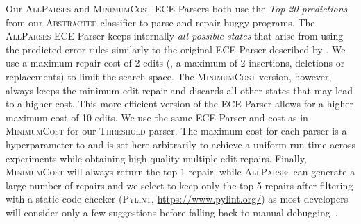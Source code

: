 Our \textsc{AllParses} and \textsc{MinimumCost} ECE-Parsers both use the
\emph{Top-20 predictions} from our \textsc{Abstracted} classifier to parse and
repair buggy programs. The \textsc{AllParses} ECE-Parser keeps internally
\emph{all possible states} that arise from using the predicted error rules
similarly to the original ECE-Parser described by \citet{Aho_1972}. We use a
maximum repair cost of 2 edits (\ie, a maximum of 2 insertions, deletions or
replacements) to limit the search space. The \textsc{MinimumCost} version,
however, always keeps the minimum-edit repair and discards all other states that
may lead to a higher cost. This more efficient version of the ECE-Parser allows
for a higher maximum cost of 10 edits. We use the same ECE-Parser and cost as in
\textsc{MinimumCost} for our \textsc{Threshold} parser. The maximum cost for
each parser is a hyperparameter to \toolname{} and is set here arbitrarily
to achieve a uniform run time across experiments while obtaining
high-quality multiple-edit repairs. Finally, \textsc{MinimumCost} will always
return the top 1 repair, while \textsc{AllParses} can generate a large number of
repairs and we select to keep only the top 5 repairs after filtering with a
static code checker (\textsc{Pylint}, \url{https://www.pylint.org/}) as most
developers will consider only a few suggestions before falling back to manual
debugging~\citep{Kochhar2016-oc, Parnin2011-ce}.


